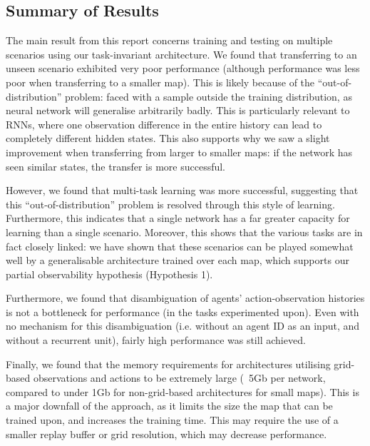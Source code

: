 \subsection{Summary of Results}

The main result from this report concerns training and testing on multiple scenarios using our task-invariant architecture. We found that transferring to an unseen scenario exhibited very poor performance (although performance was less poor when transferring to a smaller map). This is likely because of the ``out-of-distribution'' \cite{ood} problem: faced with a sample outside the training distribution, as neural network will generalise arbitrarily badly. This is particularly relevant to RNNs, where one observation difference in the entire history can lead to completely different hidden states. This also supports why we saw a slight improvement when transferring from larger to smaller maps: if the network has seen similar states, the transfer is more successful.



However, we found that multi-task learning was more successful, suggesting that this ``out-of-distribution'' problem is resolved through this style of learning. Furthermore, this indicates that a single network has a far greater capacity for learning than a single scenario. Moreover, this shows that the various tasks are in fact closely linked: we have shown that these scenarios can be played somewhat well by a generalisable architecture trained over each map, which supports our partial observability hypothesis (Hypothesis 1).

Furthermore, we found that disambiguation of agents' action-observation histories is not a bottleneck for performance (in the tasks experimented upon). Even with no mechanism for this disambiguation (i.e. without an agent ID as an input, and without a recurrent unit), fairly high performance was still achieved.

Finally, we found that the memory requirements for architectures utilising grid-based observations and actions to be extremely large (~5Gb per network, compared to under 1Gb for non-grid-based architectures for small maps). This is a major downfall of the approach, as it limits the size the map that can be trained upon, and increases the training time. This may require the use of a smaller replay buffer or grid resolution, which may decrease performance.





